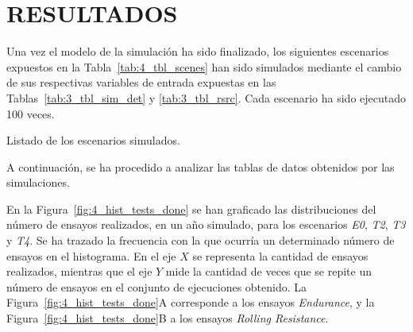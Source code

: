 
\section{RESULTADOS}

Una vez el modelo de la simulación ha sido finalizado,
los siguientes escenarios expuestos en la Tabla~\ref{tab:4_tbl_scenes}
han sido simulados mediante el cambio de sus respectivas variables de entrada
expuestas en las Tablas~\ref{tab:3_tbl_sim_det} y \ref{tab:3_tbl_rsrc}.
Cada escenario ha sido ejecutado 100 veces.

\begin{table}[h]
	\centering
	\caption{Listado de los escenarios simulados.}
	
	\label{tab:4_tbl_scenes}
\end{table}

A continuación,
se ha procedido a analizar las tablas de datos obtenidos por las simulaciones.

En la Figura~\ref{fig:4_hist_tests_done} se han graficado
las distribuciones del número de ensayos realizados, en un año simulado,
para los escenarios \textit{E0}, \textit{T2}, \textit{T3} y \textit{T4}.
Se ha trazado la frecuencia
con la que ocurría un determinado número de ensayos en el histograma.
En el eje $X$ se representa la cantidad de ensayos realizados,
mientras que el eje $Y$ mide la cantidad de veces que se repite
un número de ensayos en el conjunto de ejecuciones obtenido.
La Figura~\ref{fig:4_hist_tests_done}A corresponde
a los ensayos \textit{Endurance},
y la Figura~\ref{fig:4_hist_tests_done}B 
a los ensayos \textit{Rolling Resistance}.

